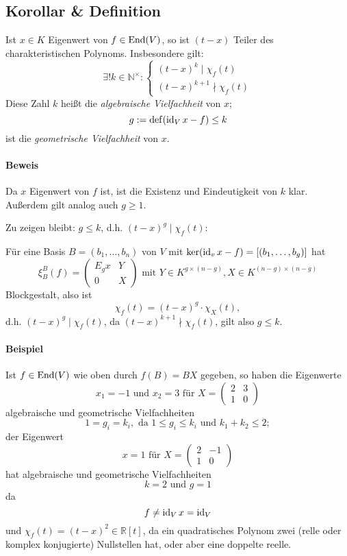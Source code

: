 \subsection{Korollar \& Definition}
	Ist $ x\in K $ Eigenwert von $ f\in\operatorname{End}(V) $, so ist $ (t-x) $ Teiler des charakteristischen Polynoms. Insbesondere gilt:
		\[ \exists!k\in \mathbb{N}^\times:
			\begin{cases}
				(t-x)^k\mid \chi_f(t)\\
				(t-x)^{k+1}\nmid \chi_f(t)
			\end{cases} \]
	Diese Zahl $ k $ heißt die \emph{algebraische Vielfachheit} von $ x $;
		\[ g:= \operatorname{def}(\operatorname{id}_Vx-f) \leq k \]
	ist die \emph{geometrische Vielfachheit} von $ x $.
\paragraph{Beweis}
	Da $ x $ Eigenwert von $ f $ ist, ist die Existenz und Eindeutigkeit von $ k $ klar. Außerdem gilt analog auch $ g\geq 1 $.
	
	Zu zeigen bleibt: $ g\leq k $, d.h. $ (t-x)^g \mid \chi_f(t) $:
	
	Für eine Basis $ B = (b_1,\dots,b_n) $ von $ V $ mit
	$ \ker (\operatorname{id}_v x - f) = [(b_1,\dots,b_g)]$
	hat
		\[ \xi_B^B(f) =
		\begin{pmatrix}
			E_gx & Y\\
			0 & X
		\end{pmatrix}
		\text{ mit } Y\in K^{g\times (n-g)}, X\in K^{(n-g)\times(n-g)} \]
	Blockgestalt, also ist
		\[ \chi_f(t)=(t-x)^g\cdot \chi_X(t), \]
	d.h. $ (t-x)^g \mid \chi_f(t)$, da $ (t-x)^{k+1}\nmid \chi_f(t) $, gilt also $ g\leq k $.
\paragraph{Beispiel}
	Ist $ f\in\operatorname{End}(V) $ wie oben durch $ f(B)=BX $ gegeben, so haben die Eigenwerte
		\[ x_1 = -1 \text{ und } x_2 = 3 \text{ für }
		X=\begin{pmatrix} 2 &3\\1 & 0 \end{pmatrix} \]
	algebraische und geometrische Vielfachheiten 
		\[ 1 = g_i = k_i, \text{ da } 1\leq g_i \leq k_i \text{ und } k_1+k_2 \leq 2; \]
	der Eigenwert
		\[ x=1 \text{ für } X = \begin{pmatrix} 2&-1\\1&0 \end{pmatrix} \]
	hat algebraische und geometrische Vielfachheiten
		\[ k = 2 \text{ und } g = 1 \]
	da
		\[ f\neq \operatorname{id}_V x = \operatorname{id}_V \]
	und $ \chi_f(t)=(t-x)^2 \in \mathbb{R}[t] $, da ein quadratisches Polynom zwei (relle oder komplex konjugierte) Nullstellen hat, oder aber eine doppelte reelle.

